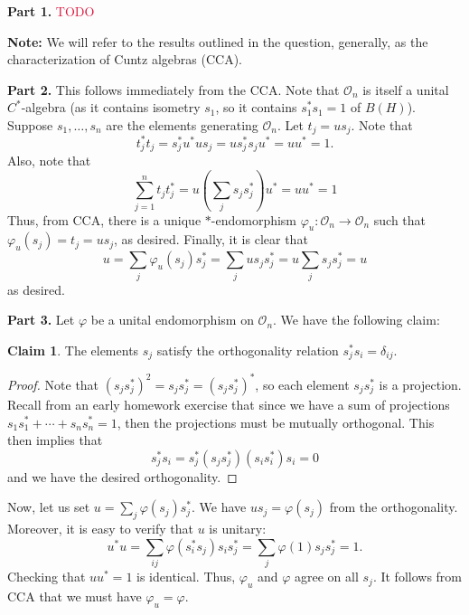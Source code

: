 \documentclass[aps,pra,showpacs,notitlepage,onecolumn,superscriptaddress,nofootinbib]{revtex4-1}
\newcommand{\pop}[1]{\textcolor{crimson}{#1}}
\theoremstyle{definition}
\newtheorem{claim}{Claim}[section]
\begin{document}
\noindent \textbf{Part 1.} \pop{TODO}
\newline

\noindent \textbf{Note:} We will refer to the results outlined in the question, generally, as the characterization of Cuntz algebras (CCA).
\newline

\noindent \textbf{Part 2.} This follows immediately from the CCA. Note that $\mathcal{O}_n$ is itself a unital $C^{*}$-algebra (as it contains isometry $s_1$, so it contains $s^{*}_1 s_1 = 1$ of $B(H)$).
Suppose $s_1, \dots, s_n$ are the elements generating $\mathcal{O}_n$. Let $t_j = u s_j$. Note that
$$t_j^{*} t_j = s_j^{*} u^{*} u s_j = u s_j^{*} s_j u^{*} = u u^{*} = 1.$$
Also, note that
\begin{equation}
  \displaystyle\sum_{j = 1}^{n} t_j t_j^{*} = u \left( \displaystyle\sum_{j} s_j s_j^{*} \right) u^{*} = u u^{*} = 1
\end{equation}
Thus, from CCA, there is a unique $*$-endomorphism $\varphi_u : \mathcal{O}_n \rightarrow \mathcal{O}_n$ such that $\varphi_u(s_j) = t_j = u s_j$, as desired. Finally, it is clear that
\begin{equation}
  u = \displaystyle\sum_{j} \varphi_u(s_j) s_j^{*} = \displaystyle\sum_{j} u s_j s_j^{*} = u \displaystyle\sum_{j} s_j s_j^{*} = u
\end{equation}
as desired.
\newline

\noindent \textbf{Part 3.} Let $\varphi$ be a unital endomorphism on $\mathcal{O}_n$. We have the following claim:

\begin{claim}
The elements $s_{j}$ satisfy the orthogonality relation $s_j^{*} s_i = \delta_{ij}$.
\end{claim}
\begin{proof}
  Note that $(s_j s_j^{*})^2 = s_j s_j^{*} = (s_j s_j^{*})^{*}$, so each element $s_j s_j^{*}$ is a projection. Recall from an early homework exercise
  that since we have a sum of projections $s_1 s_1^{*} + \cdots + s_n s_n^{*} = 1$, then the projections must be mutually orthogonal. This then
  implies that
  \begin{equation}
    s_j^{*} s_i = s_j^{*} (s_j s_j^{*}) (s_i s_i^{*}) s_i = 0
  \end{equation}
  and we have the desired orthogonality.
\end{proof}
\noindent Now, let us set $u = \sum_{j} \varphi(s_j) s_j^{*}$. We have $u s_j = \varphi(s_j)$ from the orthogonality. Moreover, it is easy to verify that $u$ is unitary:
\begin{equation}
  u^{*} u = \displaystyle\sum_{ij} \varphi(s_i^{*} s_j) s_i s_j^{*} = \displaystyle\sum_{j} \varphi(1) s_j s_j^{*} = 1.
\end{equation}
Checking that $u u^{*} = 1$ is identical. Thus, $\varphi_u$ and $\varphi$ agree on all $s_j$. It follows from CCA that we must have $\varphi_u = \varphi$.
\newline
\end{document}
